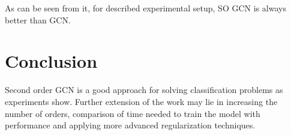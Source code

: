 \documentclass{article}
\begin{document}
As can be seen from it, for described experimental setup, SO GCN is always better than GCN. 

\section{Conclusion}

Second order GCN is a good approach for solving classification problems as experiments show. Further extension of the work may lie in increasing the number of orders, comparison of time needed to train the model with performance and applying more advanced regularization techniques.



\end{document}
